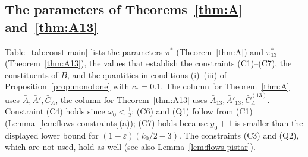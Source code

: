 \documentclass[11pt]{amsart}
\newcommand{\eps}{\varepsilon}
\newcommand{\Lam}{\Lambda}
\theoremstyle{definition}
\theoremstyle{remark}
\numberwithin{equation}{section}
\begin{document}
\subsection{The parameters of \texorpdfstring{Theorems~\ref{thm:A} and~\ref{thm:A13}}{Theorems A and A13}}\label{subsec:const-main}

Table~\ref{tab:const-main} lists the parameters $\pi^*$ (Theorem~\ref{thm:A}) and $\pi^*_{13}$ (Theorem~\ref{thm:A13}),
the values that establish the constraints (C1)--(C7), the constituents of $\bar B$, and the quantities in
conditions (i)--(iii) of Proposition~\ref{prop:monotone} with $c_*=0.1$. The column for Theorem~\ref{thm:A} uses
$\bar A,\bar A',\bar C_\Lam$, the column for Theorem~\ref{thm:A13} uses $\bar A_{13},\bar A'_{13},\bar C^{(13)}_\Lam$.
Constraint (C4) holds since $\omega_0<\frac12$; (C6) and (Q1) follow from (C1) (Lemma~\ref{lem:flows-constraints}(a));
(C7) holds because $y_0+1$ is smaller than the displayed lower bound for $(1-\eps)(k_0/2-3)$. The constraints (C3) and
(Q2), which are not used, hold as well (see also Lemma~\ref{lem:flows-pistar}).
\end{document}
